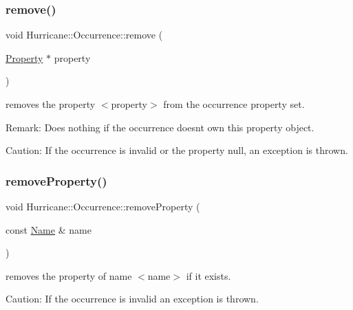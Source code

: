 \mbox{\label{classHurricane_1_1Occurrence_a774404aa5eb01371f64cf5fda3f3ffbf}} 
\subsubsection{\texorpdfstring{remove()}{remove()}}
{\footnotesize\ttfamily void Hurricane\+::\+Occurrence\+::remove (\begin{DoxyParamCaption}\item[{\hyperlink{classHurricane_1_1Property}{Property} $\ast$}]{property }\end{DoxyParamCaption})}

removes the property {\ttfamily $<$property$>$} from the occurrence property set.

\begin{DoxyParagraph}{Remark\+:}
Does nothing if the occurrence doesn\textquotesingle{}t own this property object.
\end{DoxyParagraph}
\begin{DoxyParagraph}{Caution\+:}
If the occurrence is invalid or the property null, an exception is thrown. 
\end{DoxyParagraph}
\mbox{\label{classHurricane_1_1Occurrence_a8d86755bf50cbc7fd2849b039a372b0a}} 
\subsubsection{\texorpdfstring{remove\+Property()}{removeProperty()}}
{\footnotesize\ttfamily void Hurricane\+::\+Occurrence\+::remove\+Property (\begin{DoxyParamCaption}\item[{const \hyperlink{classHurricane_1_1Name}{Name} \&}]{name }\end{DoxyParamCaption})}

removes the property of name {\ttfamily $<$name$>$} if it exists.

\begin{DoxyParagraph}{Caution\+:}
If the occurrence is invalid an exception is thrown. 
\end{DoxyParagraph}


